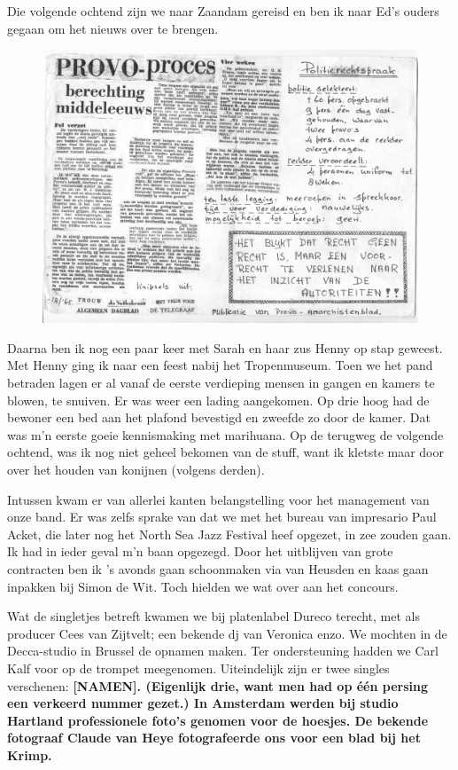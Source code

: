 \documentclass[10pt,twoside, openright]{memoir}
\begin{document}
Die volgende ochtend zijn we naar Zaandam gereisd en ben ik naar Ed’s ouders gegaan om het nieuws over te brengen. 


\begin{figure}
\includegraphics[width=\textwidth]{img/ch27/aug65EdE}
\end{figure}

Daarna ben ik nog een paar keer met Sarah en haar zus Henny op stap geweest. Met Henny ging ik naar een feest nabij het Tropenmuseum. Toen we het pand betraden lagen er al vanaf de eerste verdieping mensen in gangen en kamers te blowen, te snuiven. Er was weer een lading aangekomen. Op drie hoog had de bewoner een bed aan het plafond bevestigd en zweefde zo door de kamer. Dat was m’n eerste goeie kennismaking met marihuana. Op de terugweg de volgende ochtend, was ik nog niet geheel bekomen van de stuff, want ik kletste maar door over het houden van konijnen (volgens derden).

Intussen kwam er van allerlei kanten belangstelling voor het management van onze band. Er was zelfs sprake van dat we met het bureau van impresario Paul Acket, die later nog het North Sea Jazz Festival heef opgezet, in zee zouden gaan. Ik had in ieder geval m’n baan opgezegd. Door het uitblijven van grote contracten ben ik ’s avonds gaan schoonmaken via van Heusden en kaas gaan inpakken bij Simon de Wit. Toch hielden we wat over aan het concours.

Wat de singletjes betreft kwamen we bij platenlabel Dureco terecht, met als producer Cees van Zijtvelt; een bekende dj van Veronica enzo. We mochten in de Decca-studio in Brussel de opnamen maken. Ter ondersteuning hadden we Carl Kalf voor op de trompet meegenomen. Uiteindelijk zijn er twee singles verschenen: \bf{[NAMEN]}. (Eigenlijk drie, want men had op één persing een verkeerd nummer gezet.) In Amsterdam werden bij studio Hartland professionele foto’s genomen voor de hoesjes. De bekende fotograaf Claude van Heye fotografeerde ons voor een blad bij het Krimp.
\end{document}
